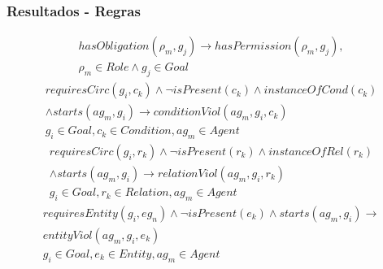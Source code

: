 \documentclass{beamer}
\begin{document}
\begin{frame}
	\frametitle{Resultados - Regras}
	\begin{eqnarray}\label{violationrelation}\nonumber
		hasObligation(\rho_m,g_j) \to hasPermission(\rho_m,g_j), \nonumber \\
    	\rho_m \in Role \wedge g_j \in Goal
	\end{eqnarray}
	\begin{eqnarray}\label{violationentity}\nonumber
		requiresCirc(g_i,c_k) \wedge \neg isPresent(c_k) \wedge  instanceOfCond(c_k) \nonumber \\ 
		\wedge  starts(ag_m,g_i)  \to conditionViol(ag_m,g_i,c_k) \nonumber \\  
    	g_i \in Goal, c_k \in Condition, ag_m \in Agent
	\end{eqnarray}
	\begin{eqnarray}\label{relationViol}\nonumber
		requiresCirc(g_i,r_k)\wedge \neg isPresent(r_k) \wedge instanceOfRel(r_k) \nonumber \\ 
		\wedge starts(ag_m,g_i) \to relationViol(ag_m,g_i,r_k) \nonumber \\  
    	g_i \in Goal, r_k \in Relation, ag_m \in Agent
	\end{eqnarray}
	\begin{eqnarray}\label{entityViol}\nonumber
		requiresEntity(g_i,eg_n) \wedge \neg isPresent(e_k) \wedge starts(ag_m,g_i) \to \nonumber \\ 
	    entityViol(ag_m,g_i,e_k)  \nonumber \\  
	    g_i \in Goal, e_k \in Entity, ag_m \in Agent
	\end{eqnarray}
\end{frame}
\end{document}

